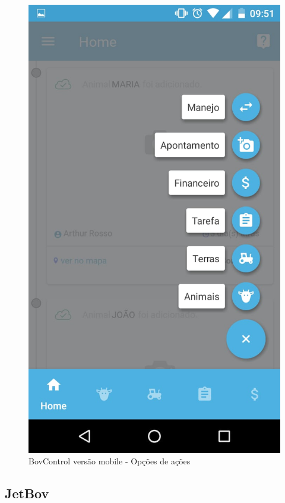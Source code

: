 \documentclass[12pt]{article}
\begin{document}
\begin{titlepage}
\begin{figure}[!h]
\begin{center}
\caption{BovControl versão mobile - Opções de ações}
\includegraphics[width=6in]{img/bovcontrolapp2.jpeg}

\end{center}
\end{figure}

\newpage


\subsection{JetBov}


\end{titlepage}
\end{document}
